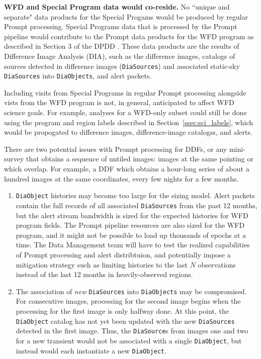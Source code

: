 \textbf{WFD and Special Program data would co-reside.}
No ``unique and separate" data products for the Special Progams would be 
produced by regular Prompt processing.
Special Programs data that is processed by the Prompt pipeline would 
contribute to the Prompt data products for the WFD program as 
described in Section 3 of the DPDD . 
These data products are the results of Difference Image Analysis (DIA),
such as the difference images, catalogs of sources detected in difference
images ({\tt DiaSources}) and associated static-sky {\tt DiaSources}
into {\tt DiaObjects}, and alert packets.

Including visits from Special Programs in regular Prompt processing alongside
vists from the WFD program is not, in general, anticipated to affect WFD science goals.
For example, analyses for a WFD-only subset could still be done using the program and
region labels described in Section~\ref{ssec:sci_labels}, which would be
propogated to difference images, difference-image catalogss, and alerts.


There are two potential issues with Prompt processing for DDFs, or any mini-survey 
that obtains a sequence of untiled images: images at the same pointing or which overlap.
For example, a DDF which obtains a hour-long series of about a hundred images at the same coordinates,
every few nights for a few months.

\begin{enumerate}

\item {\tt DiaObject} histories may become too large for the sizing model.
Alert packets contain the full records of all associated 
{\tt DiaSources} from the past 12 months, but the alert
stream bandwidth is sized for the expected histories for
WFD program fields. 
The Prompt pipeline resources are also sized for the
WFD program, and it might not be possible to load up
thousands of epochs at a time.
The Data Management team will have to test the realized
capabilities of Prompt processing and alert distribtuion,
and potentially impose a mitigation strategy such as
limiting histories to the last $N$ observations instead
of the last 12 months in heavily-observed regions.

\item The association of {\it new} {\tt DiaSources} into {\tt DiaObjects} 
may be compromised.
For consecutive images, processing for the second image begins when the processing for the 
first image is only halfway done.
At this point, the {\tt DiaObject} catalog has 
not yet been updated with the new {\tt DiaSources} detected in the first image.
Thus, the {\tt DiaSource}s from images one and two for a new transient 
would not be associated with a single {\tt DiaObject}, but instead would 
each instantiate a new {\tt DiaObject}.

\end{enumerate}

